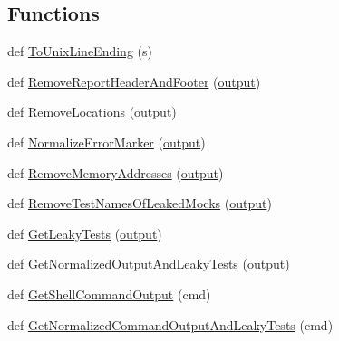 \subsection*{Functions}
\begin{DoxyCompactItemize}
\item 
def \mbox{\hyperlink{namespacegoogletest-master_1_1googlemock_1_1test_1_1gmock__output__test_a60fe2de77b8c5df0abb239eee6947541}{To\+Unix\+Line\+Ending}} (s)
\item 
def \mbox{\hyperlink{namespacegoogletest-master_1_1googlemock_1_1test_1_1gmock__output__test_a36ac7596b56fb98251c967892b3084e8}{Remove\+Report\+Header\+And\+Footer}} (\mbox{\hyperlink{namespacegoogletest-master_1_1googlemock_1_1test_1_1gmock__output__test_aeb6a355098823499c6b52d5410d41917}{output}})
\item 
def \mbox{\hyperlink{namespacegoogletest-master_1_1googlemock_1_1test_1_1gmock__output__test_a15fab5a49de017b50f2097718e27a692}{Remove\+Locations}} (\mbox{\hyperlink{namespacegoogletest-master_1_1googlemock_1_1test_1_1gmock__output__test_aeb6a355098823499c6b52d5410d41917}{output}})
\item 
def \mbox{\hyperlink{namespacegoogletest-master_1_1googlemock_1_1test_1_1gmock__output__test_ae184ab736471e4c83caf78ad10a728b3}{Normalize\+Error\+Marker}} (\mbox{\hyperlink{namespacegoogletest-master_1_1googlemock_1_1test_1_1gmock__output__test_aeb6a355098823499c6b52d5410d41917}{output}})
\item 
def \mbox{\hyperlink{namespacegoogletest-master_1_1googlemock_1_1test_1_1gmock__output__test_a3abad68f2ceddcd56df89df82e0a73ba}{Remove\+Memory\+Addresses}} (\mbox{\hyperlink{namespacegoogletest-master_1_1googlemock_1_1test_1_1gmock__output__test_aeb6a355098823499c6b52d5410d41917}{output}})
\item 
def \mbox{\hyperlink{namespacegoogletest-master_1_1googlemock_1_1test_1_1gmock__output__test_ab051f436abf40f52e9b9e1d4e672a553}{Remove\+Test\+Names\+Of\+Leaked\+Mocks}} (\mbox{\hyperlink{namespacegoogletest-master_1_1googlemock_1_1test_1_1gmock__output__test_aeb6a355098823499c6b52d5410d41917}{output}})
\item 
def \mbox{\hyperlink{namespacegoogletest-master_1_1googlemock_1_1test_1_1gmock__output__test_ab097fee171feda7db02bd1eb1b405e56}{Get\+Leaky\+Tests}} (\mbox{\hyperlink{namespacegoogletest-master_1_1googlemock_1_1test_1_1gmock__output__test_aeb6a355098823499c6b52d5410d41917}{output}})
\item 
def \mbox{\hyperlink{namespacegoogletest-master_1_1googlemock_1_1test_1_1gmock__output__test_a12292601e8aeeb9110380b806c463002}{Get\+Normalized\+Output\+And\+Leaky\+Tests}} (\mbox{\hyperlink{namespacegoogletest-master_1_1googlemock_1_1test_1_1gmock__output__test_aeb6a355098823499c6b52d5410d41917}{output}})
\item 
def \mbox{\hyperlink{namespacegoogletest-master_1_1googlemock_1_1test_1_1gmock__output__test_a2665f5cbda1f02e5ed515a5bcfc7babc}{Get\+Shell\+Command\+Output}} (cmd)
\item 
def \mbox{\hyperlink{namespacegoogletest-master_1_1googlemock_1_1test_1_1gmock__output__test_acee7eb51bf9983950a6f6847c7541233}{Get\+Normalized\+Command\+Output\+And\+Leaky\+Tests}} (cmd)
\end{DoxyCompactItemize}
